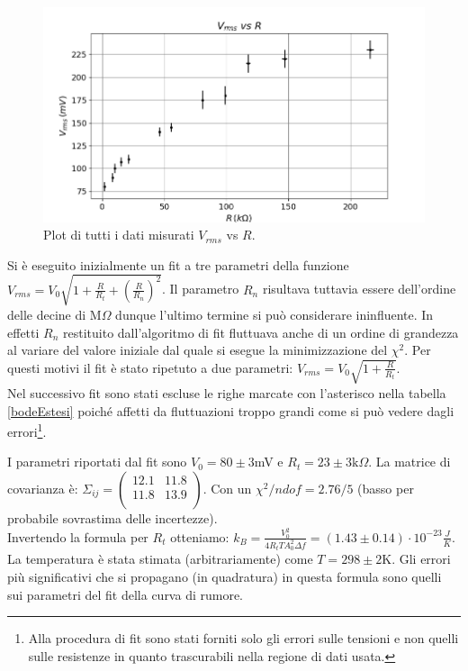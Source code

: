 \documentclass[10pt,a4paper]{article}
\begin{document}
\begin{figure}[!htb]
\centering
\includegraphics[scale=0.7]{boltzmannEsteso.png}
\caption{Plot di tutti i dati misurati $V_{rms}$ vs $R$.\label{boltzmannEsteso}}
\end{figure}

Si è eseguito inizialmente un fit a tre parametri della funzione $V_{rms} = V_0 \sqrt{1+\frac{R}{R_t}+(\frac{R}{R_n})^2}$. Il parametro $R_n$ risultava tuttavia essere dell'ordine delle decine di $\mbox{M}\Omega$ dunque l'ultimo termine si può considerare ininfluente. In effetti $R_n$ restituito dall'algoritmo di fit fluttuava anche di un ordine di grandezza al variare del valore iniziale dal quale si esegue la minimizzazione del $\chi^2$. Per questi motivi il fit è stato ripetuto a due parametri: $V_{rms} = V_0 \sqrt{1+\frac{R}{R_t}}$.
\\
Nel successivo fit sono stati escluse le righe marcate con l'asterisco nella tabella \ref{bodeEstesi} poiché affetti da fluttuazioni troppo grandi come si può vedere dagli errori\footnote{Alla procedura di fit sono stati forniti solo gli errori sulle tensioni e non quelli sulle resistenze in quanto trascurabili nella regione di dati usata.}.

I parametri riportati dal fit sono $V_0 = 80 \pm 3$mV e $R_t = 23 \pm 3 \mbox{k}\Omega$. La matrice di covarianza è:  $\Sigma_{ij} = \left( \begin{array}{cc}
12.1 & 11.8\\ 
11.8 & 13.9\\
\end{array} \right)$. Con un $\chi^2/ndof = 2.76/5$ (basso per probabile sovrastima delle incertezze).\\
Invertendo la formula per $R_t$ otteniamo: $k_B = \frac{V_0^2}{4 R_t T A_0^2 \Delta f}=(1.43 \pm 0.14) \cdot 10^{-23} \frac{J}{K}$. La temperatura è stata stimata (arbitrariamente) come $T = 298 \pm 2$K. Gli errori più significativi che si propagano (in quadratura) in questa formula sono quelli sui parametri del fit della curva di rumore.
\end{document}
